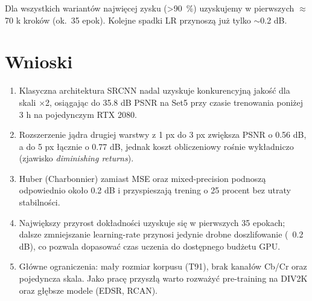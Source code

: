 \documentclass[11pt]{article}
\begin{document}
Dla wszystkich wariantów najwięcej zysku (>\SI{90}{\percent})
uzyskujemy w pierwszych \(\approx\)70 k kroków
(ok.~35 epok).  Kolejne spadki LR przynoszą już tylko
\(\sim\)0.2 dB.


\section{Wnioski}
\label{sec:conclusion}

\begin{enumerate}
  \item Klasyczna architektura SRCNN nadal uzyskuje konkurencyjną
        jakość dla skali ×2, osiągając do 35.8 dB PSNR na Set5
        przy czasie trenowania poniżej 3 h na pojedynczym RTX 2080.
  \item Rozszerzenie jądra drugiej warstwy z 1 px do 3 px
        zwiększa PSNR o 0.56 dB, a do 5 px łącznie o 0.77 dB,
        jednak koszt obliczeniowy rośnie wykładniczo
        (zjawisko \emph{diminishing returns}).
  \item Huber (Charbonnier) zamiast MSE oraz mixed-precision
        podnoszą odpowiednio około 0.2 dB i przyspieszają
        trening o 25 procent bez utraty stabilności.
  \item Największy przyrost dokładności uzyskuje się w pierwszych
        35 epokach; dalsze zmniejszanie learning-rate przynosi
        jedynie drobne doszlifowanie (~0.2 dB), co pozwala
        dopasować czas uczenia do dostępnego budżetu GPU.
  \item Główne ograniczenia: mały rozmiar korpusu (T91),
        brak kanałów Cb/Cr oraz pojedyncza skala.  Jako
        pracę przyszłą warto rozważyć pre-training na DIV2K
        oraz głębsze modele (EDSR, RCAN).
\end{enumerate}
\end{document}
